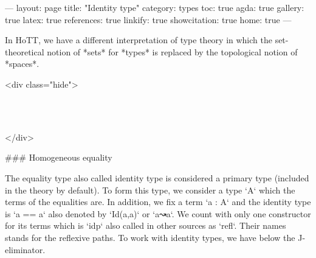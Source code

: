 ---
layout: page
title: "Identity type"
category: types
toc: true
agda: true
gallery: true
latex: true
references: true
linkify: true
showcitation: true
home: true
---

In HoTT, we have a different interpretation of type theory in which the
set-theoretical notion of *sets* for *types* is replaced by the topological
notion of *spaces*.

<div class="hide">
\begin{code}%
\>[0]\AgdaSymbol{\{-\#}\AgdaSpace{}%
\AgdaSpace{}%
\AgdaSpace{}%
\AgdaSymbol{\#-\}}\<%
\\
\>[0]\AgdaSpace{}%
\AgdaSpace{}%
%
\>[27]\<%
\\
\>[0]\AgdaSpace{}%
\AgdaSpace{}%
\AgdaSpace{}%
\<%
\end{code}
</div>

### Homogeneous equality

The equality type also called identity type is considered a primary type
(included in the theory by default). To form this type, we consider a type `A`
which the terms of the equalities are. In addition, we fix a term `a : A` and
the identity type is `a == a` also denoted by `Id(a,a)` or `a↝a`. We count with
only one constructor for its terms which is `idp` also called in other sources
as `refl`. Their names stands for the reflexive paths. To work with identity
types, we have below the J-eliminator.

\begin{code}%
\>[0]\<%
\\
\>[0][@{}l@{\AgdaIndent{0}}]%
\>[2]\AgdaOperator{\AgdaDatatype{\AgdaUnderscore{}==\AgdaUnderscore{}}}\AgdaSpace{}%
\AgdaSymbol{\{}\AgdaSpace{}%
\AgdaSymbol{:}\AgdaSpace{}%
\AgdaSpace{}%
\AgdaSymbol{\}}\AgdaSpace{}%
\AgdaSymbol{(}\AgdaSpace{}%
\AgdaSymbol{:}\AgdaSpace{}%
\AgdaSymbol{)}\<%
\\
\>[2][@{}l@{\AgdaIndent{0}}]%
\>[4]\AgdaSymbol{:}\AgdaSpace{}%
\AgdaSpace{}%
\AgdaSpace{}%
\AgdaSpace{}%
\<%
\\
%
\>[2]\<%
\\
%
\>[2]\AgdaSpace{}%
\AgdaSymbol{:}\AgdaSpace{}%
\AgdaSpace{}%
\AgdaOperator{\AgdaDatatype{==}}\AgdaSpace{}%
\<%
\end{code}

